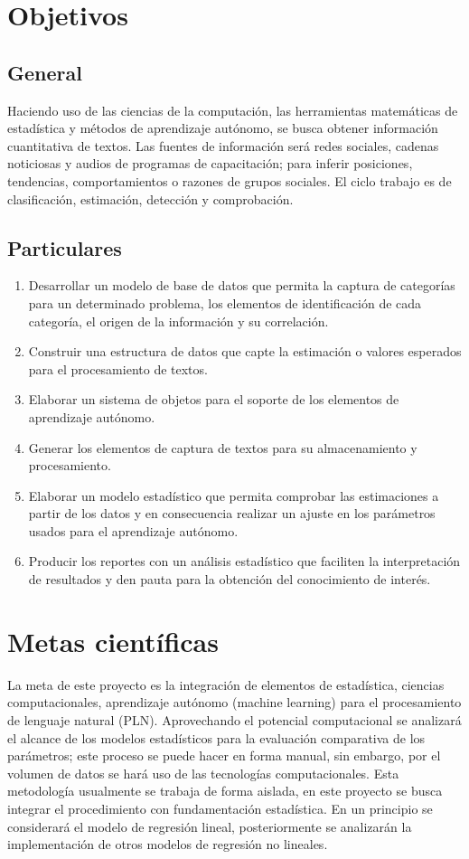 \section {Objetivos}
\subsection {General}
Haciendo uso de las ciencias de la computación, las herramientas matemáticas de estadística y métodos de aprendizaje autónomo, se busca obtener información cuantitativa de textos. Las fuentes de información será redes sociales, cadenas noticiosas y audios de programas de capacitación; para inferir posiciones, tendencias, comportamientos o razones de grupos sociales. El ciclo trabajo es de clasificación, estimación, detección y comprobación.
\subsection {Particulares}
\begin{enumerate}
    \item Desarrollar un modelo de base de datos que permita la captura de categorías para un determinado problema, los elementos de identificación de cada categoría, el origen de la información y su correlación.
    \item Construir una estructura de datos que capte la estimación o valores esperados para el procesamiento de textos.
    \item Elaborar un sistema de objetos para el soporte de los elementos de aprendizaje autónomo.
    \item Generar los elementos de captura de textos para su almacenamiento y procesamiento.
    \item Elaborar un modelo estadístico que permita comprobar las estimaciones a partir de los datos y en consecuencia realizar un ajuste en los parámetros usados para el aprendizaje autónomo.
    \item Producir los reportes con un análisis estadístico que faciliten la interpretación de resultados y den pauta para la obtención del conocimiento de interés.
\end{enumerate}
\section {Metas científicas}
La meta de este proyecto es la integración de elementos de estadística, ciencias computacionales, aprendizaje autónomo (machine learning) para el procesamiento de lenguaje natural (PLN). Aprovechando el potencial computacional se analizará el alcance de los modelos estadísticos para la evaluación comparativa de los parámetros; este proceso se puede hacer en forma manual, sin embargo, por el volumen de datos se hará uso de las tecnologías computacionales.
Esta metodología usualmente se trabaja de forma aislada, en este proyecto se busca integrar el procedimiento con fundamentación estadística. En un principio se considerará el modelo de regresión lineal, posteriormente se analizarán la implementación de otros modelos de regresión no lineales.